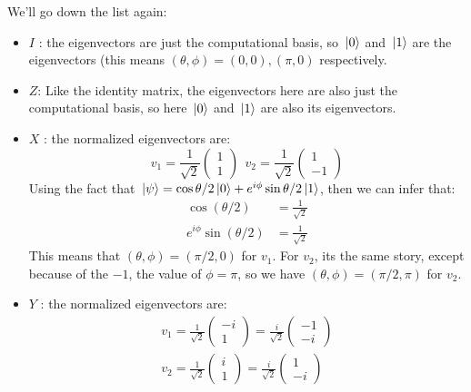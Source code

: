\documentclass[10pt]{article}
\begin{document}
\begin{enumerate}[label=\alph*)]
			\begin{solution}
				We'll go down the list again:
				\begin{itemize}
					\item \( I \) : the eigenvectors are just the computational basis, so \( \ket*{0} \) and 
						\( \ket*{1} \) are the eigenvectors (this means \( (\theta, \phi) = (0, 0), 
						 (\pi, 0)\) respectively.
					\item \( Z \): Like the identity matrix, the eigenvectors here are also just the computational 
						basis, so here \( \ket*{0} \) and \( \ket*{1} \) are also its eigenvectors.
					\item \( X \) : the normalized eigenvectors are:
						\[
						v_1 = \frac{1}{\sqrt{2} }\begin{pmatrix} 1\\1 \end{pmatrix} \ \ v_2 = 
						\frac{1}{\sqrt{2} }\begin{pmatrix} 1\\-1 \end{pmatrix} 
						\] 
						Using the fact that \( \ket*{\psi} = \cos \theta / 2 \ket*{0} + 
						e^{i \phi}\sin \theta / 2 \ket*{1}\), then we can infer that:
						\begin{align*}
							\cos(\theta / 2) &= \frac{1}{\sqrt{2} }\\
							e^{i \phi} \sin(\theta / 2) &= \frac{1}{\sqrt{2} }
						\end{align*}
						This means that \( (\theta, \phi) = (\pi /2, 0) \) for \( v_1 \). For \( v_2 \), its 
						the same story, except because of the \( -1 \), the value of \( \phi = \pi \), so 
						we have \( (\theta, \phi) = (\pi /2, \pi) \) for \( v_2 \).
					\item \( Y \) : the normalized eigenvectors are: 
						\begin{align*}
						v_1 = \frac{1}{\sqrt{2} }\begin{pmatrix} -i\\1 \end{pmatrix} = \frac{i}{\sqrt{2} }
						\begin{pmatrix} -1\\-i \end{pmatrix} \\
						v_2 = \frac{1}{\sqrt{2} }\begin{pmatrix} i\\1 \end{pmatrix} = 
						\frac{i}{\sqrt{2} }\begin{pmatrix} 1\\-i \end{pmatrix} 

\end{align*}
\end{itemize}
\end{solution}
\end{enumerate}
\end{document}
